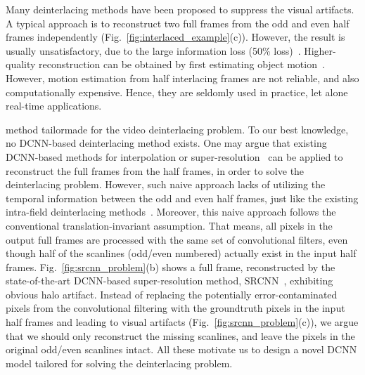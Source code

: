 \documentclass[acmtog]{acmart}
\begin{document}
Many deinterlacing methods have been proposed to suppress the visual artifacts.
A typical approach is to reconstruct two full frames from the odd and even half
frames independently (Fig.~\ref{fig:interlaced_example}(c)). However, the result
is usually unsatisfactory, due to the large information 
loss (50\% loss)~\cite{doyle1990interlaced,wang2012efficient,wang2013moving}. 
Higher-quality reconstruction can be obtained by first estimating object 
motion~\cite{jeon2009weighted,mohammadi2012enhanced,lee2013high}. However, motion
estimation from half interlacing frames are not reliable, and also computationally expensive.
Hence, they are seldomly used in practice, 
let alone real-time applications.

method tailormade for the video deinterlacing problem. To our best knowledge, no
DCNN-based deinterlacing method exists. One may argue that existing DCNN-based
methods for interpolation or super-resolution~\cite{mallat2016understanding,dong2016image} can be applied to
reconstruct the full frames from the half frames, in order to solve the
deinterlacing problem. However, such naive approach lacks of utilizing the
temporal information between the odd and even half frames, just like the existing
intra-field deinterlacing methods~\cite{doyle1990interlaced,wang2012efficient}. Moreover,
this naive approach follows the conventional translation-invariant assumption.
That means, all pixels in the output full frames are processed with the same set
of convolutional filters, even though half of the scanlines (odd/even numbered)
actually exist in the input half frames. Fig.~\ref{fig:srcnn_problem}(b) shows
a full frame, reconstructed by the state-of-the-art DCNN-based super-resolution method,
SRCNN~\cite{dong2016image}, exhibiting obvious halo artifact. 
Instead of replacing the potentially error-contaminated pixels from the convolutional filtering with the groundtruth
pixels in the input half frames and leading to visual artifacts
(Fig.~\ref{fig:srcnn_problem}(c)), we argue that we should only reconstruct the
missing scanlines, and leave the pixels in the original odd/even scanlines
intact. All these motivate us to design a novel DCNN model tailored for
solving the deinterlacing problem.
\end{document}
